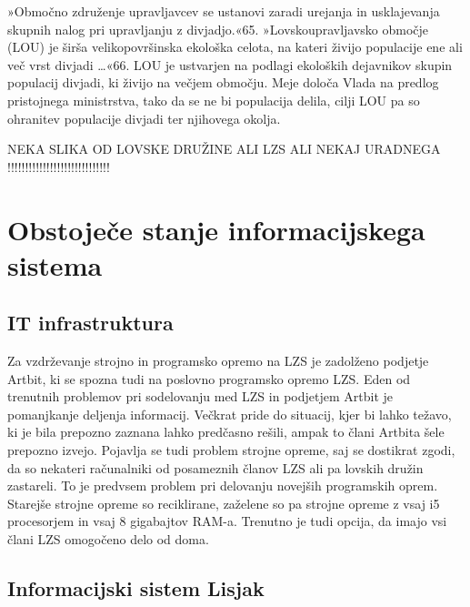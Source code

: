 \documentclass[a4paper,12pt,openright]{book}
\begin{document}
»Območno združenje upravljavcev se ustanovi zaradi urejanja in usklajevanja skupnih nalog pri upravljanju z divjadjo.«{65}.
»Lovskoupravljavsko območje (LOU) je širša velikopovršinska ekološka celota, na kateri živijo populacije ene ali več vrst divjadi …«{66}. 
LOU je ustvarjen na podlagi ekoloških dejavnikov skupin populacij divjadi, ki živijo na večjem območju. 
Meje določa Vlada na predlog pristojnega ministrstva, tako da se ne bi populacija delila, cilji LOU pa so ohranitev populacije divjadi ter njihovega okolja.

NEKA SLIKA OD LOVSKE DRUŽINE ALI LZS ALI NEKAJ URADNEGA !!!!!!!!!!!!!!!!!!!!!!!!!!!!!





\chapter{Obstoječe stanje informacijskega sistema}
\label{stanje}


\section{IT infrastruktura}

Za vzdrževanje strojno in programsko opremo na LZS je zadolženo podjetje Artbit, ki se spozna tudi na poslovno programsko opremo LZS.
Eden od trenutnih problemov pri sodelovanju med LZS in podjetjem Artbit je pomanjkanje deljenja informacij. 
Večkrat pride do situacij, kjer bi lahko težavo, ki je bila prepozno zaznana lahko predčasno rešili, ampak to člani Artbita šele prepozno izvejo.
Pojavlja se tudi problem strojne opreme, saj se dostikrat zgodi, da so nekateri računalniki od posameznih članov LZS ali pa lovskih družin zastareli.
To je predvsem problem pri delovanju novejših programskih oprem.
Starejše strojne opreme so reciklirane, zaželene so pa strojne opreme z vsaj i5 procesorjem in vsaj 8 gigabajtov RAM-a.
Trenutno je tudi opcija, da imajo vsi člani LZS omogočeno delo od doma.

\section{Informacijski sistem Lisjak}
\end{document}
